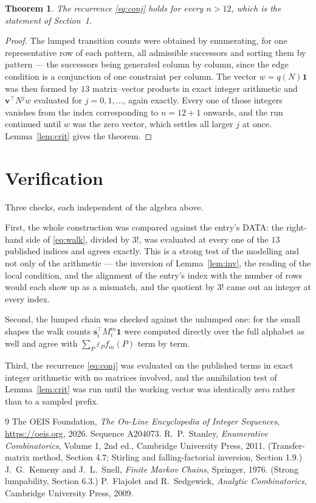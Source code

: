 \documentclass[11pt,a4paper]{article}
\theoremstyle{plain}
\newtheorem{theorem}{Theorem}
\theoremstyle{definition}
\begin{document}
\begin{theorem}
The recurrence \eqref{eq:conj} holds for every $n>12$, which is the statement of
Section~1.
\end{theorem}

\begin{proof}
The lumped transition counts were obtained by enumerating, for one representative row of
each pattern, all admissible successors and sorting them by pattern --- the successors being
generated column by column, since the edge condition is a conjunction of one constraint per
column. The vector $w=q(N)\mathbf{1}$ was then formed by $13$ matrix--vector products
in exact integer arithmetic and $\mathbf{v}^{\!\top}N^{j}w$ evaluated for
$j=0,1,\dots$, again exactly. Every one of those integers vanishes from the index
corresponding to $n=12+1$ onwards, and the run continued until $w$ was the zero vector,
which settles all larger $j$ at once. Lemma~\ref{lem:crit} gives the theorem.
\end{proof}

\section{Verification}

Three checks, each independent of the algebra above.

First, the whole construction was compared against the entry's DATA: the right-hand side of
\eqref{eq:walk}, divided by $3!$, was evaluated at every one of the $13$
published indices and agrees exactly. This is a strong test of the modelling and not only of
the arithmetic --- the inversion of Lemma~\ref{lem:inv}, the reading of the local
condition, and the alignment of the entry's index with the number of rows would each
show up as a mismatch, and the quotient by $3!$ came out an integer at every index.

Second, the lumped chain was checked against the unlumped one: for the small shapes the walk
counts $\mathbf{s}_i^{\!\top}M_i^{m}\mathbf{1}$ were computed directly over the full
alphabet as well and agree with $\sum_P\varepsilon_Pf_m(P)$ term by term.

Third, the recurrence \eqref{eq:conj} was evaluated on the published terms in exact integer
arithmetic with no matrices involved, and the annihilation test of Lemma~\ref{lem:crit} was
run until the working vector was identically zero rather than to a sampled prefix.

\begin{thebibliography}{9}
 The OEIS Foundation, \emph{The On-Line Encyclopedia of Integer
Sequences}, \url{https://oeis.org}, 2026. Sequence A204073.
 R.~P.~Stanley, \emph{Enumerative Combinatorics}, Volume 1, 2nd ed.,
Cambridge University Press, 2011. (Transfer-matrix method, Section 4.7; Stirling and
falling-factorial inversion, Section 1.9.)
 J.~G.~Kemeny and J.~L.~Snell, \emph{Finite Markov Chains}, Springer,
1976. (Strong lumpability, Section 6.3.)
 P.~Flajolet and R.~Sedgewick, \emph{Analytic Combinatorics}, Cambridge
University Press, 2009.
\end{thebibliography}
\end{document}
